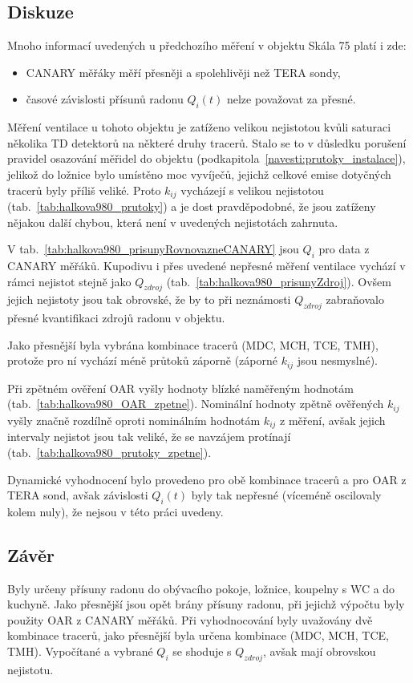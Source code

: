\subsection{Diskuze}
Mnoho informací uvedených u předchozího měření v objektu Skála 75 platí i zde:
\begin{itemize}
    \item CANARY měřáky měří přesněji a spolehlivěji než TERA sondy,
    \item časové závislosti přísunů radonu $Q_i(t)$ nelze považovat za přesné.
\end{itemize}

Měření ventilace u tohoto objektu je zatíženo velikou nejistotou kvůli saturaci několika TD detektorů na některé druhy tracerů. Stalo se to v důsledku porušení pravidel osazování měřidel do objektu (podkapitola~\ref{navesti:prutoky_instalace}), jelikož do ložnice bylo umístěno moc vyvíječů, jejichž celkové emise dotyčných tracerů byly příliš veliké. Proto $k_{ij}$ vycházejí s velikou nejistotou (tab.~\ref{tab:halkova980_prutoky}) a je dost pravděpodobné, že jsou zatíženy nějakou další chybou, která není v uvedených nejistotách zahrnuta. 

V tab.~\ref{tab:halkova980_prisunyRovnovazneCANARY} jsou $Q_i$ pro data z CANARY měřáků. Kupodivu i přes uvedené nepřesné měření ventilace vychází v rámci nejistot stejně jako $Q_{zdroj}$ (tab.~\ref{tab:halkova980_prisunyZdroj}). Ovšem jejich nejistoty jsou tak obrovské, že by to při neznámosti $Q_{zdroj}$ zabraňovalo přesné kvantifikaci zdrojů radonu v objektu.

Jako přesnější byla vybrána kombinace tracerů (MDC, MCH, TCE, TMH), protože pro ní vychází méně průtoků záporně (záporné $k_{ij}$ jsou nesmyslné).

Při zpětném ověření OAR vyšly hodnoty blízké naměřeným hodnotám (tab.~\ref{tab:halkova980_OAR_zpetne}). Nominální hodnoty zpětně ověřených $k_{ij}$ vyšly značně rozdílně oproti nominálním hodnotám $k_{ij}$ z měření, avšak jejich intervaly nejistot jsou tak veliké, že se navzájem protínají (tab.~\ref{tab:halkova980_prutoky_zpetne}). 

Dynamické vyhodnocení bylo provedeno pro obě kombinace tracerů a pro OAR z TERA sond, avšak závislosti $Q_i(t)$ byly tak nepřesné (víceméně oscilovaly kolem nuly), že nejsou v této práci uvedeny.
\subsection{Závěr}
Byly určeny přísuny radonu do obývacího pokoje, ložnice, koupelny s WC a do kuchyně. Jako přesnější jsou opět brány přísuny radonu, při jejichž výpočtu byly použity OAR z CANARY měřáků. Při vyhodnocování byly uvažovány dvě kombinace tracerů, jako přesnější byla určena kombinace (MDC, MCH, TCE, TMH). Vypočítané a vybrané $Q_i$ se shoduje s $Q_{zdroj}$, avšak mají obrovskou nejistotu.

